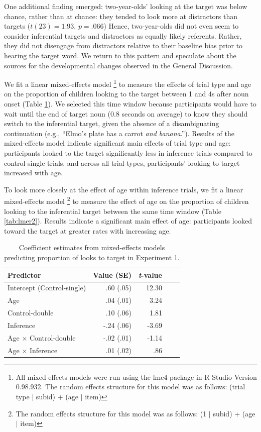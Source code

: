 \documentclass[10pt,letterpaper]{article}
\begin{document}
One additional finding emerged: two-year-olds' looking at the target was below chance, rather than at chance: they tended to look more at distractors than targets ($t(23)  = 1.93$, $p = .066$) Hence, two-year-olds did not even seem to consider inferential targets and distractors as equally likely referents. Rather, they did not disengage from distractors relative to their baseline bias prior to hearing the target word. We return to this pattern and speculate about the sources for the developmental changes observed in the General Discussion. 

We fit a linear mixed-effects model \footnote{All mixed-effects models were run using the lme4 package in R Studio Version 0.98.932. The random effects structure for this model was as follows: (trial type $|$ subid) + (age $|$ item)} to measure the effects of trial type and age on the proportion of children looking to the target between 1 and 4s after noun onset (Table \ref{tab:lmer1}). We selected this time window because participants would have to wait until the end of target noun (0.8 seconds on average) to know they should switch to the inferential target, given the absence of a disambiguating continuation (e.g., ``Elmo's plate has a carrot \emph{and banana}.''). Results of the mixed-effects model indicate significant main effects of trial type and age: participants looked to the target significantly less in inference trials compared to control-single trials, and across all trial types, participants' looking to target increased with age. 

To look more closely at the effect of age within inference trials, we fit a linear mixed-effects model \footnote{The random effects structure for this model was as follows: (1 $|$ subid) + (age $|$ item)} to measure the effect of age on the proportion of children looking to the inferential target between the same time window (Table \ref{tab:lmer2}). Results indicate a significant main effect of age: participants looked toward the target at greater rates with increasing age.

\begin{table}[b!]
\caption{\label{tab:lmer1}  Coefficient estimates from mixed-effects models predicting proportion of looks to target in Experiment 1.} 
\begin{center} 
\begin{tabular}{l r r r l} 
\hline
Predictor  &  Value (SE) & \emph{t}-value\\
\hline
Intercept (Control-single)  & .60 (.05) & 12.30 \\
Age & .04 (.01) &  3.24 \\
Control-double & .10 (.06) & 1.81 \\
Inference & -.24 (.06) & -3.69 \\
Age $\times$ Control-double & -.02 (.01) & -1.14 \\
Age $\times$ Inference & .01 (.02) & .86 \\
\hline
\end{tabular} 
\end{center} 
\end{table}
\end{document}
